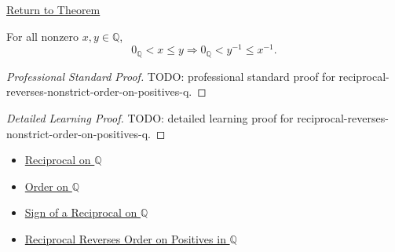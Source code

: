 \newpage
{}
\label{prf:reciprocal-reverses-nonstrict-order-on-positives-q}

\begin{remark*}[Return]
\hyperref[thm:reciprocal-reverses-nonstrict-order-on-positives-q]{Return to Theorem}
\end{remark*}

\begin{theorem*}
For all nonzero $x,y\in\mathbb{Q}$,
\[
0_{\mathbb{Q}}<x\le y
\Longrightarrow
0_{\mathbb{Q}}<y^{-1}\le x^{-1}.
\]
\end{theorem*}

\begin{proof}[Professional Standard Proof]
\LRAProofBodyStart
TODO: professional standard proof for reciprocal-reverses-nonstrict-order-on-positives-q.
\end{proof}

\begin{proof}[Detailed Learning Proof]
\LRAProofBodyStart
TODO: detailed learning proof for reciprocal-reverses-nonstrict-order-on-positives-q.
\end{proof}

\begin{remark*}
\end{remark*}

\begin{dependencies}
\begin{itemize}
  \item \hyperref[def:reciprocal-on-q-classes]{Reciprocal on $\mathbb{Q}$}
  \item \hyperref[def:order-on-q]{Order on $\mathbb{Q}$}
  \item \hyperref[thm:sign-of-reciprocal-q]{Sign of a Reciprocal on $\mathbb{Q}$}
  \item \hyperref[thm:reciprocal-reverses-order-on-positives-q]{Reciprocal Reverses Order on Positives in $\mathbb{Q}$}
\end{itemize}
\end{dependencies}

\clearpage
